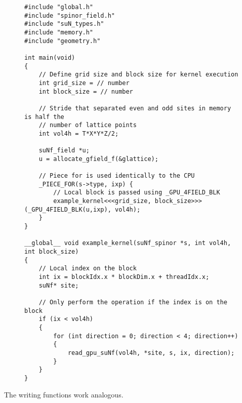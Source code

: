 \documentclass[12pt]{article}
\begin{document}
\begin{figure}[H]
\begin{lstlisting}[caption=Example for reading the field values of a spinor]
#include "global.h"
#include "spinor_field.h"
#include "suN_types.h"
#include "memory.h"
#include "geometry.h"

int main(void)
{
    // Define grid size and block size for kernel execution
    int grid_size = // number
    int block_size = // number

    // Stride that separated even and odd sites in memory is half the
    // number of lattice points
    int vol4h = T*X*Y*Z/2;

    suNf_field *u;
    u = allocate_gfield_f(&glattice);

    // Piece for is used identically to the CPU
    _PIECE_FOR(s->type, ixp) {
        // Local block is passed using _GPU_4FIELD_BLK
        example_kernel<<<grid_size, block_size>>>(_GPU_4FIELD_BLK(u,ixp), vol4h);
    }
}

__global__ void example_kernel(suNf_spinor *s, int vol4h, int block_size)
{
    // Local index on the block
    int ix = blockIdx.x * blockDim.x + threadIdx.x;
    suNf* site;

    // Only perform the operation if the index is on the block
    if (ix < vol4h)
    {
        for (int direction = 0; direction < 4; direction++)
        {
            read_gpu_suNf(vol4h, *site, s, ix, direction);
        }
    }
}
\end{lstlisting}
\end{figure}

The writing functions work analogous.
\end{document}
